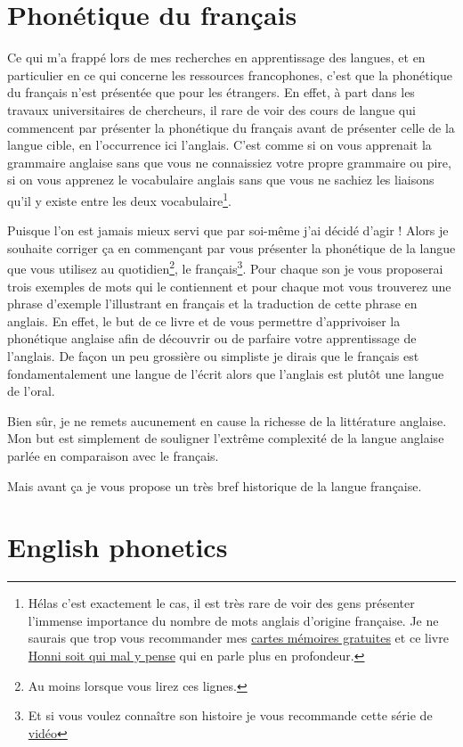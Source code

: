\documentclass[12pt,a4paper]{book}
\begin{document}
\part{Phonétique du français}
Ce qui m'a frappé lors de mes recherches en apprentissage des langues,
et en particulier en ce qui concerne les ressources francophones,
c'est que la phonétique du français n'est présentée que pour les
étrangers. En effet, à part dans les travaux universitaires de
chercheurs, il rare de voir des cours de langue qui commencent par
présenter la phonétique du français avant de présenter celle de la
langue cible, en l'occurrence ici l'anglais. C'est comme si on vous
apprenait la grammaire anglaise sans que vous ne connaissiez votre
propre grammaire ou pire, si on vous apprenez le vocabulaire anglais
sans que vous ne sachiez les liaisons qu'il y existe entre les deux
vocabulaire\footnote{Hélas c'est exactement le cas, il est très rare
  de voir des gens présenter l'immense importance du nombre de mots
  anglais d'origine française. Je ne saurais que trop vous recommander
mes
\href{https://tinycards.duolingo.com/decks/6VNKUdba/english-words-with-french-origin}{cartes
  mémoires gratuites} et ce livre
\href{https://www.amazon.fr/gp/product/225315444X/ref=as_li_tl?ie=UTF8&camp=1642&creative=6746&creativeASIN=225315444X&linkCode=as2&tag=wwwbecomefree-21&linkId=5317e7b0e063b4d6c7c676b11420e49d}{Honni
  soit qui mal y pense} qui en parle plus en profondeur.}.\par
Puisque l'on est jamais mieux servi que par soi-même j'ai décidé
d'agir ! Alors je souhaite corriger ça en commençant par vous
présenter la phonétique de la langue que vous utilisez au
quotidien\footnote{Au moins lorsque vous lirez ces lignes.}, le
français\footnote{Et si vous voulez connaître son histoire je vous
  recommande cette série de \href{https://www.youtube.com/watch?v=rHSIPt_ehvc&list=PLH2hhYn999aRfv2odG4SozTXCHbZaX_ji}{vidéo}}. Pour
chaque son je vous proposerai trois exemples de mots qui le
contiennent et pour chaque mot vous trouverez une phrase d'exemple
l'illustrant en français et la traduction de cette phrase en
anglais. En effet, le but de ce livre et de vous permettre
d'apprivoiser la phonétique anglaise afin de découvrir ou de parfaire
votre apprentissage de l'anglais. De façon un peu grossière ou
simpliste je dirais que le français est fondamentalement une langue de
l'écrit alors que l'anglais est plutôt une langue de l'oral.\par
Bien sûr, je ne remets aucunement en cause la richesse de la
littérature anglaise. Mon but est simplement de souligner l'extrême
complexité de la langue anglaise parlée en comparaison avec le
français.\par
Mais avant ça je vous propose un très bref historique de la langue
française.





 
\part{English phonetics}





\end{document}
